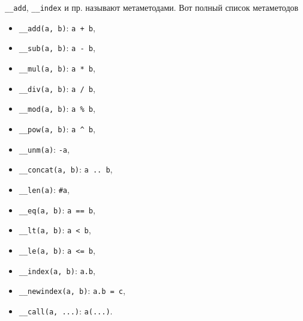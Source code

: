 \documentclass[%
	11pt,
	a4paper,
	utf8,
		]{article}
\begin{document}
\verb|__add|, \verb|__index| и пр. называют метаметодами. Вот полный список метаметодов
\begin{itemize}
	\item \verb|__add(a, b)|: \texttt{a + b},
	
	\item \verb|__sub(a, b)|: \texttt{a - b},
	
	\item \verb|__mul(a, b)|: \texttt{a * b},
	
	\item \verb|__div(a, b)|: \texttt{a / b},
	
	\item \verb|__mod(a, b)|: \texttt{a \% b},
	
	\item \verb|__pow(a, b)|: \verb|a ^ b|,
	
	\item \verb|__unm(a)|: \verb|-a|,
	
	\item \verb|__concat(a, b)|: \verb|a .. b|,
	
	\item \verb|__len(a)|: \verb|#a|,
	
	\item \verb|__eq(a, b)|: \verb|a == b|,
	
	\item \verb|__lt(a, b)|: \verb|a < b|,
	
	\item \verb|__le(a, b)|: \verb|a <= b|,
	
	\item \verb|__index(a, b)|: \verb|a.b|,
	
	\item \verb|__newindex(a, b)|: \verb|a.b = c|,
	
	\item \verb|__call(a, ...)|: \verb|a(...)|.
\end{itemize}




\begin{thebibliography}{99}
\end{thebibliography}
\end{document}
